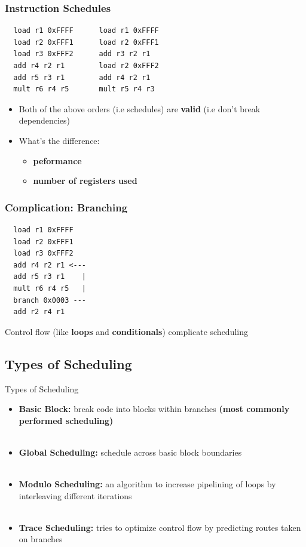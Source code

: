 \documentclass{beamer}
\begin{document}
\begin{darkframes}
\begin{frame}[fragile]
  \frametitle{Instruction Schedules}
\begin{lstlisting}
  load r1 0xFFFF      load r1 0xFFFF
  load r2 0xFFF1      load r2 0xFFF1
  load r3 0xFFF2      add r3 r2 r1
  add r4 r2 r1        load r2 0xFFF2
  add r5 r3 r1        add r4 r2 r1
  mult r6 r4 r5       mult r5 r4 r3
\end{lstlisting} 
  \begin{itemize}
  \item Both of the above orders (i.e schedules) are {\bf \color{green} valid} (i.e
  don't break dependencies)
  \item What's the difference:
  \begin{itemize}
    \item {\bf \color{cyan} peformance}
    \item {\bf \color{cyan} number of registers used}
  \end{itemize}
  \end{itemize}
\end{frame}

\begin{frame}[fragile]
  \frametitle{Complication: Branching}
  
\begin{lstlisting}
  load r1 0xFFFF
  load r2 0xFFF1
  load r3 0xFFF2 
  add r4 r2 r1 <---
  add r5 r3 r1    |
  mult r6 r4 r5   |
  branch 0x0003 ---
  add r2 r4 r1   
\end{lstlisting} 
  Control flow (like {\bf \color{green} loops} and {\bf \color{green}
    conditionals}) complicate scheduling
\end{frame}

\subsection{Types of Scheduling}
\begin{frame}{Types of Scheduling}

\begin{itemize}
	\item {\bf \color{green} Basic Block:} break code into blocks within branches {\bf \color{cyan} (most commonly performed scheduling)} \\
	\qquad \\
	\pause
	\item {\bf \color{green} Global Scheduling:} schedule across basic block boundaries \\
	\qquad \\
	\pause
	\item {\bf \color{green} Modulo Scheduling:} an algorithm to increase pipelining of loops by interleaving different iterations \\
	\qquad \\
	\pause
	\item {\bf \color{green} Trace Scheduling:} tries to optimize control flow by predicting routes taken on branches
\end{itemize}
\end{frame}


\end{darkframes}
\end{document}
